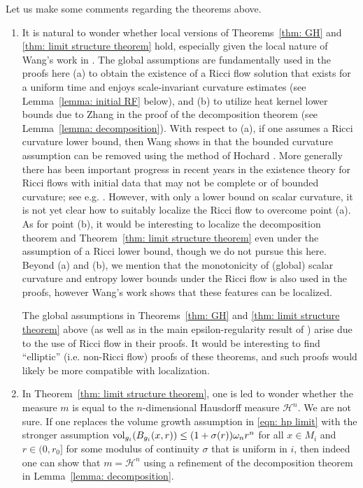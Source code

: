 \documentclass[11pt,reqno]{amsart}
\theoremstyle{remark}
\theoremstyle{definition}
\numberwithin{equation}{section}
\newcommand{\vol}{{\rm{vol}}}
\begin{document}
Let us make some comments regarding the theorems above.
\begin{enumerate}
\item It is natural to wonder whether local versions of Theorems~\ref{thm: GH} and \ref{thm: limit structure theorem} hold, 
especially given the local nature of Wang's work in \cite{BingWangA, BingWangB}.
 The global assumptions are fundamentally used in the proofs here  (a) to obtain the existence of a Ricci flow solution that exists for a uniform time and enjoys scale-invariant curvature estimates (see Lemma~\ref{lemma: initial RF} below), 
 and (b) to utilize heat kernel lower bounds due to Zhang \cite{Zhang12} in the proof of the decomposition theorem (see Lemma~\ref{lemma: decomposition}).
 With respect to (a), if one assumes a Ricci curvature lower bound, then Wang shows in  \cite[Cor 5.5]{BingWangB} that the bounded curvature assumption can be removed using the method of Hochard \cite{Hochard}. More generally  there has been important progress in recent years in the existence theory for Ricci flows with initial data that may not be complete or of bounded curvature;  see e.g. \cite{ToppingConformal, Hochard, HeExistence}. 
  However, with only a lower bound on scalar curvature, it is not yet clear how to suitably localize the Ricci flow to overcome point (a).  As for point (b), it would be interesting to localize the decomposition theorem  and Theorem~\ref{thm: limit structure theorem} even under the assumption of a Ricci lower bound, though we do not pursue this here. Beyond (a) and (b), we mention that the monotonicity of (global) scalar curvature and entropy lower bounds under the Ricci flow is also used in the proofs, however Wang's work \cite{BingWangA, BingWangB} shows that these features can be localized.
 
 The global assumptions in Theorems~\ref{thm: GH} and \ref{thm: limit structure theorem} above (as well as in the main epsilon-regularity result of \cite{LNN1}) arise due to the use of Ricci flow in their proofs. It would be interesting to find ``elliptic'' (i.e. non-Ricci flow) proofs of these theorems, and  such  proofs would likely be more compatible with localization.

\item In Theorem~\ref{thm: limit structure theorem}, one is led to wonder whether the measure $m$ is equal to the $n$-dimensional Hausdorff measure $\mathcal{H}^n$. We are not sure. If one replaces the volume growth assumption in \eqref{eqn: hp limit} with the stronger assumption $\vol_{g_i}(B_{g_i}(x, r)) \leq (1+ \sigma(r))\omega_n r^n$ for all $x \in M_i$ and $r \in (0, r_0]$ for some modulus of continuity $\sigma$ that is uniform in $i$, then indeed one can show that $m = \mathcal{H}^{n}$ using a refinement of the decomposition theorem in Lemma~\ref{lemma: decomposition}. 


\end{enumerate}
\end{document}
